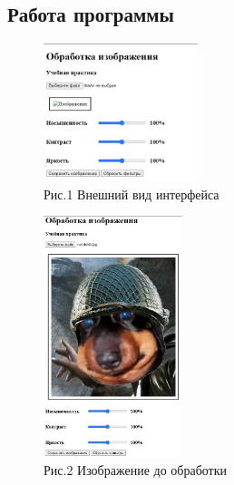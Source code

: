 \documentclass[12pt,a4paper]{scrartcl}
\begin{document}
\subsection{Работа программы}


\begin{figure}
  \begin{center}
    \includegraphics[width=0.40\textwidth]{ui.jpg}
  \end{center}
  \caption{Рис.1  Внешний вид интерфейса}\label{fig:ex}
\end{figure}

\begin{figure}
  \begin{center}
    \includegraphics[width=0.36\textwidth]{primer0.jpg}
  \end{center}
  \caption{Рис.2  Изображение до обработки}\label{fig:ex}
\end{figure}
\end{document}
